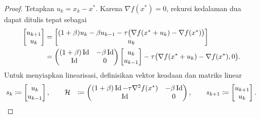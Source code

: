 \begin{proof}
    Tetapkan \(u_k=x_k-x^*\). Karena \(\nabla f(x^*)=0\), rekursi kedalaman dua dapat ditulis tepat sebagai
    \begin{equation}
        \begin{aligned}
            \begin{bmatrix}
                u_{k+1}\\
                u_k
            \end{bmatrix}
            &=
            \begin{bmatrix}
                (1+\beta)u_k-\beta u_{k-1}
                -\tau\bigl(\nabla f(x^*+u_k)-\nabla f(x^*)\bigr)\\
                u_k
            \end{bmatrix}\\
            &=
            \begin{pmatrix}
                (1+\beta)\operatorname{\mathrm{Id}}&-\beta\operatorname{\mathrm{Id}}\\
                \operatorname{\mathrm{Id}}&0
            \end{pmatrix}
            \begin{bmatrix}
                u_k\\
                u_{k-1}
            \end{bmatrix}
            -\tau\bigl(\nabla f(x^*+u_k)-\nabla f(x^*),0\bigr).
        \end{aligned}
    \end{equation}
    Untuk menyiapkan linearisasi, definisikan vektor keadaan dan matriks linear
    \begin{equation}
        \begin{aligned}
            s_k&\coloneqq
            \begin{bmatrix}
                u_k\\
                u_{k-1}
            \end{bmatrix},
            \qquad
            \mathcal{H}&\coloneqq
            \begin{pmatrix}
                (1+\beta)\Id-\tau\nabla^2f(x^*)&-\beta\Id\\
                \Id&0
            \end{pmatrix},
            \qquad
            s_{k+1}\coloneqq
            \begin{bmatrix}
                u_{k+1}\\
                u_k
            \end{bmatrix}.
        \end{aligned}

\end{equation}
\end{proof}
